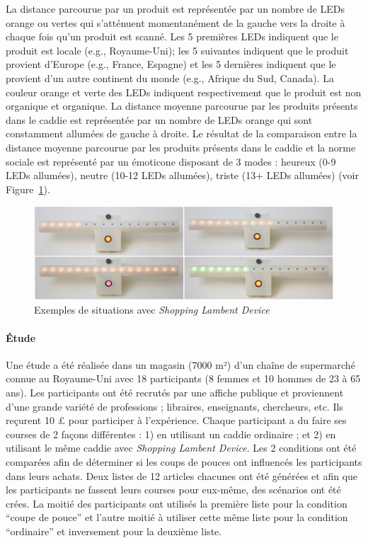 \documentclass[10pt,a5paper,twoside]{article}
\begin{document}
La distance parcourue par un produit est représentée par un nombre de
LEDs orange ou vertes qui s'atténuent momentanément de la gauche vers la
droite à chaque fois qu'un produit est scanné. Les 5 premières LEDs
indiquent que le produit est locale (e.g., Royaume-Uni); les 5 suivantes
indiquent que le produit provient d'Europe (e.g., France, Espagne) et
les 5 dernières indiquent que le provient d'un autre continent du monde
(e.g., Afrique du Sud, Canada). La couleur orange et verte des LEDs
indiquent respectivement que le produit est non organique et organique.
La distance moyenne parcourue par les produits présents dans le caddie
est représentée par un nombre de LEDs orange qui sont constamment
allumées de gauche à droite. Le résultat de la comparaison entre la
distance moyenne parcourue par les produits présents dans le caddie et
la norme sociale est représenté par un émoticone disposant de 3 modes :
heureux (0-9 LEDs allumées), neutre (10-12 LEDs allumées), triste (13+
LEDs allumées) (voir Figure~\ref{fig:shoppinglambent3}).

\begin{figure}
\centering
\includegraphics[]{images/shoppinglambent-screenshot4.png}
\caption{Exemples de situations avec \emph{Shopping Lambent
Device}}\label{fig:shoppinglambent3}
\end{figure}

\paragraph{Étude}\label{uxe9tude-4}

Une étude a été réalisée dans un magasin (7000 m²) d'un chaîne de
supermarché connue au Royaume-Uni avec 18 participants (8 femmes et 10
hommes de 23 à 65 ans). Les participants ont été recrutés par une
affiche publique et proviennent d'une grande variété de professions ;
libraires, enseignants, chercheurs, etc. Ils reçurent 10 £ pour
participer à l'expérience. Chaque participant a du faire ses courses de
2 façons différentes : 1) en utilisant un caddie ordinaire ; et 2) en
utilisant le même caddie avec \emph{Shopping Lambent Device}. Les 2
conditions ont été comparées afin de déterminer si les coups de pouces
ont influencés les participants dans leurs achats. Deux listes de 12
articles chacunes ont été générées et afin que les participants ne
fassent leurs courses pour eux-même, des scénarios ont été crées. La
moitié des participants ont utilisés la première liste pour la condition
``coupe de pouce'' et l'autre moitié à utiliser cette même liste pour la
condition ``ordinaire'' et inversement pour la deuxième liste.
\end{document}
